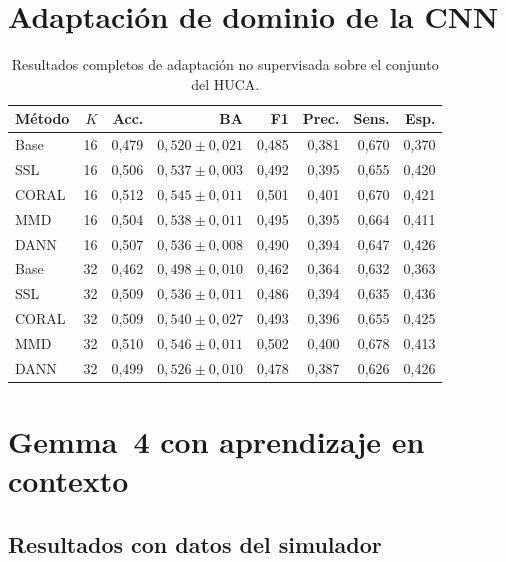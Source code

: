 
\section{Adaptación de dominio de la CNN}

\begin{table}[H]
  \centering
  \small
  \begin{tabular}{lrrrrrrr}
    \toprule
    Método & \(K\) & Acc. & BA & F1 & Prec. & Sens. & Esp. \\
    \midrule
    Base & 16 & 0,479 & \(0,520 \pm 0,021\) & 0,485 & 0,381 & 0,670 & 0,370 \\
    SSL & 16 & 0,506 & \(0,537 \pm 0,003\) & 0,492 & 0,395 & 0,655 & 0,420 \\
    CORAL & 16 & 0,512 & \(0,545 \pm 0,011\) & 0,501 & 0,401 & 0,670 & 0,421 \\
    MMD & 16 & 0,504 & \(0,538 \pm 0,011\) & 0,495 & 0,395 & 0,664 & 0,411 \\
    DANN & 16 & 0,507 & \(0,536 \pm 0,008\) & 0,490 & 0,394 & 0,647 & 0,426 \\
    \midrule
    Base & 32 & 0,462 & \(0,498 \pm 0,010\) & 0,462 & 0,364 & 0,632 & 0,363 \\
    SSL & 32 & 0,509 & \(0,536 \pm 0,011\) & 0,486 & 0,394 & 0,635 & 0,436 \\
    CORAL & 32 & 0,509 & \(0,540 \pm 0,027\) & 0,493 & 0,396 & 0,655 & 0,425 \\
    MMD & 32 & 0,510 & \(0,546 \pm 0,011\) & 0,502 & 0,400 & 0,678 & 0,413 \\
    DANN & 32 & 0,499 & \(0,526 \pm 0,010\) & 0,478 & 0,387 & 0,626 & 0,426 \\
    \bottomrule
  \end{tabular}
  \caption{Resultados completos de adaptación no supervisada sobre el conjunto del HUCA.}
  \label{tab:app_domain_completo}
  \resultstablenote
\end{table}

\clearpage
\section{Gemma~4 con aprendizaje en contexto}

\subsection{Resultados con datos del simulador}

